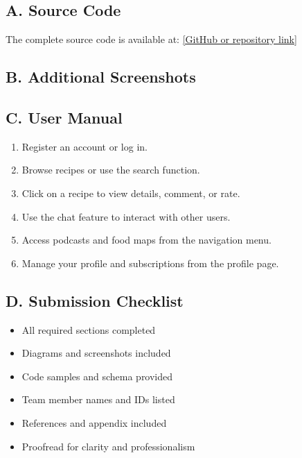 \documentclass[conference]{IEEEtran}
\begin{document}
\subsection*{A. Source Code}
The complete source code is available at: \url{[GitHub or repository link]}

\subsection*{B. Additional Screenshots}

\subsection*{C. User Manual}
\begin{enumerate}
    \item Register an account or log in.
    \item Browse recipes or use the search function.
    \item Click on a recipe to view details, comment, or rate.
    \item Use the chat feature to interact with other users.
    \item Access podcasts and food maps from the navigation menu.
    \item Manage your profile and subscriptions from the profile page.
\end{enumerate}

\subsection*{D. Submission Checklist}
\begin{itemize}
    \item All required sections completed
    \item Diagrams and screenshots included
    \item Code samples and schema provided
    \item Team member names and IDs listed
    \item References and appendix included
    \item Proofread for clarity and professionalism
\end{itemize}
\end{document}
